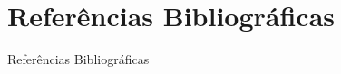 \section{Referências Bibliográficas}

\begin{frame}{Referências Bibliográficas}


  
  

\end{frame}

